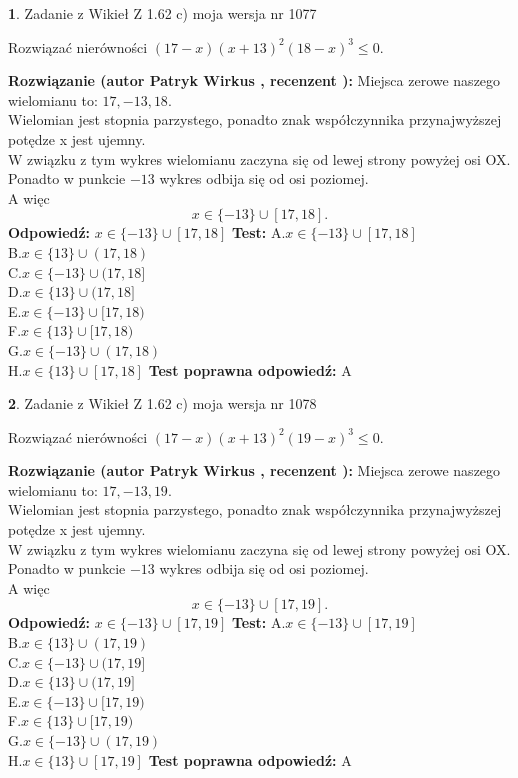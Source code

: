 \documentclass[12pt, a4paper]{article}
\theoremstyle{definition} %
\newtheorem{zad}{}
\newcommand{\zadStart}[1]{\begin{zad}#1\newline}
\newcommand{\zadStop}{\end{zad}}
\newcommand{\rozwStart}[2]{\noindent \textbf{Rozwiązanie (autor #1 , recenzent #2): }\newline}
\newcommand{\rozwStop}{\newline}
\newcommand{\odpStart}{\noindent \textbf{Odpowiedź:}\newline}
\newcommand{\odpStop}{\newline}
\newcommand{\testStart}{\noindent \textbf{Test:}\newline}
\newcommand{\testStop}{\newline}
\newcommand{\kluczStart}{\noindent \textbf{Test poprawna odpowiedź:}\newline}
\newcommand{\kluczStop}{\newline}
\begin{document}
\zadStart{Zadanie z Wikieł Z 1.62 c) moja wersja nr 1077}

Rozwiązać nierówności $(17-x)(x+13)^{2}(18-x)^{3}\le0$.
\zadStop
\rozwStart{Patryk Wirkus}{}
Miejsca zerowe naszego wielomianu to: $17, -13, 18$.\\
Wielomian jest stopnia parzystego, ponadto znak współczynnika przy\linebreak najwyższej potędze x jest ujemny.\\ W związku z tym wykres wielomianu zaczyna się od lewej strony powyżej osi OX.\\
Ponadto w punkcie $-13$ wykres odbija się od osi poziomej.\\
A więc $$x \in \{-13\} \cup [17,18].$$
\rozwStop
\odpStart
$x \in \{-13\} \cup [17,18]$
\odpStop
\testStart
A.$x \in \{-13\} \cup [17,18]$\\
B.$x \in \{13\} \cup (17,18)$\\
C.$x \in \{-13\} \cup (17,18]$\\
D.$x \in \{13\} \cup (17,18]$\\
E.$x \in \{-13\} \cup [17,18)$\\
F.$x \in \{13\} \cup [17,18)$\\
G.$x \in \{-13\} \cup (17,18)$\\
H.$x \in \{13\} \cup [17,18]$
\testStop
\kluczStart
A
\kluczStop



\zadStart{Zadanie z Wikieł Z 1.62 c) moja wersja nr 1078}

Rozwiązać nierówności $(17-x)(x+13)^{2}(19-x)^{3}\le0$.
\zadStop
\rozwStart{Patryk Wirkus}{}
Miejsca zerowe naszego wielomianu to: $17, -13, 19$.\\
Wielomian jest stopnia parzystego, ponadto znak współczynnika przy\linebreak najwyższej potędze x jest ujemny.\\ W związku z tym wykres wielomianu zaczyna się od lewej strony powyżej osi OX.\\
Ponadto w punkcie $-13$ wykres odbija się od osi poziomej.\\
A więc $$x \in \{-13\} \cup [17,19].$$
\rozwStop
\odpStart
$x \in \{-13\} \cup [17,19]$
\odpStop
\testStart
A.$x \in \{-13\} \cup [17,19]$\\
B.$x \in \{13\} \cup (17,19)$\\
C.$x \in \{-13\} \cup (17,19]$\\
D.$x \in \{13\} \cup (17,19]$\\
E.$x \in \{-13\} \cup [17,19)$\\
F.$x \in \{13\} \cup [17,19)$\\
G.$x \in \{-13\} \cup (17,19)$\\
H.$x \in \{13\} \cup [17,19]$
\testStop
\kluczStart
A
\kluczStop
\end{document}
